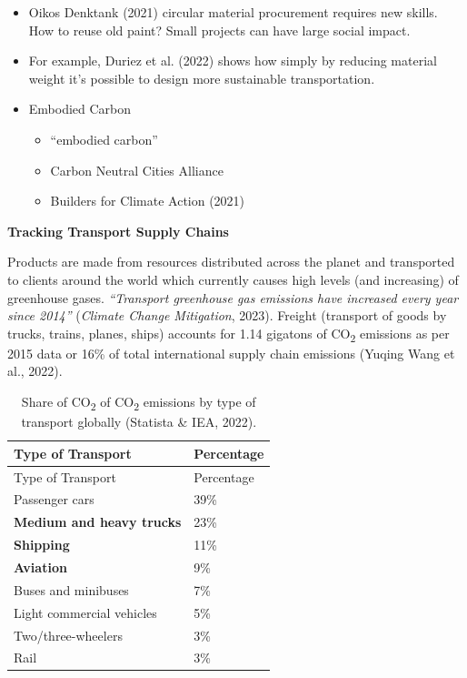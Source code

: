 \documentclass[
  letterpaper,
  DIV=11,
  numbers=noendperiod]{scrartcl}
\providecommand{\tightlist}{%
  \setlength{\itemsep}{0pt}\setlength{\parskip}{0pt}}\usepackage{longtable,booktabs,array}
\begin{document}
\begin{itemize}
\tightlist
\item
  Oikos Denktank (2021) circular material procurement requires new
  skills. How to reuse old paint? Small projects can have large social
  impact.
\item
  For example, Duriez et al. (2022) shows how simply by reducing
  material weight it's possible to design more sustainable
  transportation.
\item
  Embodied Carbon

  \begin{itemize}
  \tightlist
  \item
    ``embodied carbon''
  \item
    Carbon Neutral Cities Alliance
  \item
    Builders for Climate Action (2021)
  \end{itemize}
\end{itemize}

\textbf{Tracking Transport Supply Chains}

Products are made from resources distributed across the planet and
transported to clients around the world which currently causes high
levels (and increasing) of greenhouse gases. \emph{``Transport
greenhouse gas emissions have increased every year since 2014''}
(\emph{Climate Change Mitigation}, 2023). Freight (transport of goods by
trucks, trains, planes, ships) accounts for 1.14 gigatons of
CO\textsubscript{2} emissions as per 2015 data or 16\% of total
international supply chain emissions (Yuqing Wang et al., 2022).

\begin{longtable}[]{@{}ll@{}}
\caption{Share of CO\textsubscript{2} of CO\textsubscript{2} emissions
by type of transport globally (Statista \& IEA, 2022).}\tabularnewline
\toprule\noalign{}
Type of Transport & Percentage \\
\midrule\noalign{}
\endfirsthead
\toprule\noalign{}
Type of Transport & Percentage \\
\midrule\noalign{}
\endhead
\bottomrule\noalign{}
\endlastfoot
Passenger cars & 39\% \\
\textbf{Medium and heavy trucks} & 23\% \\
\textbf{Shipping} & 11\% \\
\textbf{Aviation} & 9\% \\
Buses and minibuses & 7\% \\
Light commercial vehicles & 5\% \\
Two/three-wheelers & 3\% \\
Rail & 3\% \\
\end{longtable}
\end{document}

